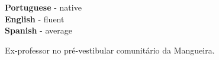 \documentclass[9pt]{developercv} %
\begin{document}
\begin{minipage}[t]{0.3\textwidth}
	\vspace{-\baselineskip} %

	
	\textbf{Portuguese} - native\\
	\textbf{English} - fluent\\
	\textbf{Spanish} - average
\end{minipage}
\hfill
\begin{minipage}[t]{0.3\textwidth}
	\vspace{-\baselineskip} %
	
	
	Ex-professor no pré-vestibular comunitário da Mangueira.
\end{minipage}

\end{document}
